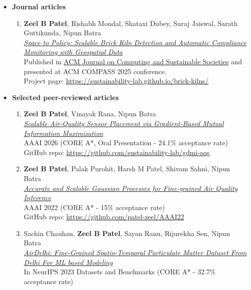 \documentclass[letter,10pt]{article}
\begin{document}
\begin{itemize}
    \item[]\textbf{Journal articles}
    \begin{enumerate}
        \item{\textbf{Zeel B Patel}, Rishabh Mondal, Shataxi Dubey, Suraj Jaiswal, Sarath Guttikunda, Nipun Batra\\
        \href{https://arxiv.org/abs/2412.04065}{\textit{Space to Policy: Scalable Brick Kiln Detection and Automatic Compliance Monitoring with Geospatial Data}}\\
        Published in \href{https://dl.acm.org/journal/acmjcss}{ACM Journal on Computing and Sustainable Societies} and presented at ACM COMPASS 2025 conference.
        }\\
        Project page: \href{https://sustainability-lab.github.io/brick-kilns/}{https://sustainability-lab.github.io/brick-kilns/}
        
    \end{enumerate}
    
    \item[]\textbf{Selected peer-reviewed articles}
    \begin{enumerate}
    
    \item{\textbf{Zeel B Patel}, Vinayak Rana, Nipun Batra}\\
    \href{https://ojs.aaai.org/index.php/AAAI/article/view/41257}{\textit{Scalable Air-Quality Sensor Placement via Gradient-Based Mutual Information Maximization}}\\
    AAAI 2026 (CORE A*, Oral Presentation - 24.1\% acceptance rate)\\
    GitHub repo: \href{https://github.com/sustainability-lab/gdmi-aqs}{https://github.com/sustainability-lab/gdmi-aqs}
    
    \item{\textbf{Zeel B Patel}, Palak Purohit, Harsh M Patel, Shivam Sahni, Nipun Batra}\\
    \href{https://ojs.aaai.org/index.php/AAAI/article/view/21467}{\textit{Accurate and Scalable Gaussian Processes for Fine-grained Air Quality Inference}}\\
    AAAI 2022 (CORE A* - 15\% acceptance rate)\\
    GitHub repo: \href{https://github.com/patel-zeel/AAAI22}{https://github.com/patel-zeel/AAAI22}

    \item{
        Sachin Chauhan, \textbf{Zeel B Patel}, Sayan Ranu, Rijurekha Sen, Nipun Batra\\
        \href{https://proceedings.neurips.cc/paper_files/paper/2023/hash/ee799aff607fcf39c01df6391e96f92c-Abstract-Datasets_and_Benchmarks.html}{\textit{AirDelhi: Fine-Grained Spatio-Temporal Particulate Matter Dataset From Delhi For ML based Modeling}}\\
        In NeurIPS 2023 Datasets and Benchmarks (CORE A* - 32.7\% acceptance rate)
    }


\end{enumerate}
\end{itemize}
\end{document}
